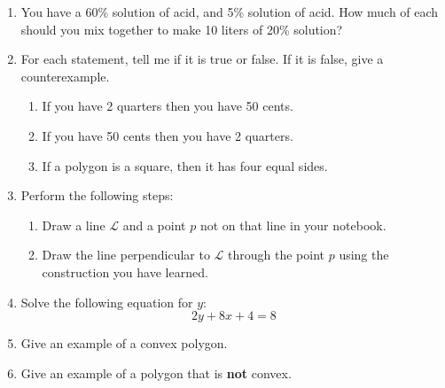 \documentclass[12pt]{article}
\begin{document}
{}
\begin{enumerate}

\item You have a 60\% solution of acid, and 5\% solution of acid.  How much of each should
you mix together to make 10 liters of 20\% solution?

\item For each statement, tell me if it is true or false.  If it is false, give a counterexample.
\begin{enumerate}
	\item If you have 2 quarters then you have 50 cents.
	\item If you have 50 cents then you have 2 quarters.
	\item If a polygon is a square, then it has four equal sides.
\end{enumerate}

\item Perform the following steps:
\begin{enumerate}
	\item Draw a line $\mathscr{L}$ and a point $p$ not on that line in your notebook.
	\item Draw the line perpendicular to $\mathscr{L}$ through the point $p$ using the construction you have learned.
\end{enumerate}

\item Solve the following equation for $y$:
$$2y + 8x + 4 = 8$$


\item Give an example of a convex polygon.

\item Give an example of a polygon that is \textbf{not} convex.


\end{enumerate}
\end{document}
